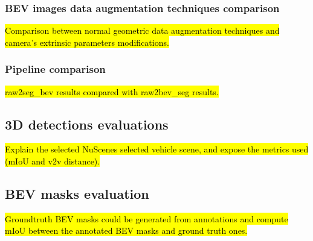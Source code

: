 \subsubsection{BEV images data augmentation techniques comparison}
\hl{Comparison between normal geometric data augmentation techniques and camera's extrinsic parameters modifications.}


\subsubsection{Pipeline comparison}
\hl{raw2seg\_bev results compared with raw2bev\_seg results.}

\subsection{3D detections evaluations}
\hl{Explain the selected NuScenes selected vehicle scene, and expose the metrics used (mIoU and v2v distance).}

\subsection{BEV masks evaluation}
\hl{Groundtruth BEV masks could be generated from annotations and compute mIoU between the annotated BEV masks and ground truth ones.}

